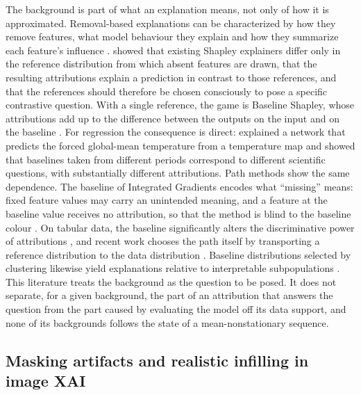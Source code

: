 \documentclass{article}
\begin{document}
The background is part of what an explanation means, not only of how it is approximated. Removal-based explanations can be characterized by how they remove features, what model behaviour they explain and how they summarize each feature's influence \citep{covert2021explaining}. \citet{merrick2020explanation} showed that existing Shapley explainers differ only in the reference distribution from which absent features are drawn, that the resulting attributions explain a prediction in contrast to those references, and that the references should therefore be chosen consciously to pose a specific contrastive question. With a single reference, the game is Baseline Shapley, whose attributions add up to the difference between the outputs on the input and on the baseline \citep{sundararajan2020many}. For regression the consequence is direct: \citet{mamalakis2023carefully} explained a network that predicts the forced global-mean temperature from a temperature map and showed that baselines taken from different periods correspond to different scientific questions, with substantially different attributions. Path methods show the same dependence. The baseline of Integrated Gradients \citep{sundararajan2017axiomatic} encodes what ``missing'' means: fixed feature values may carry an unintended meaning, and a feature at the baseline value receives no attribution, so that the method is blind to the baseline colour \citep{sturmfels2020visualizing}. On tabular data, the baseline significantly alters the discriminative power of attributions \citep{haug2021baselines}, and recent work chooses the path itself by transporting a reference distribution to the data distribution \citep{zhang2026baselines}. Baseline distributions selected by clustering likewise yield explanations relative to interpretable subpopulations \citep{chen2022explaining}. This literature treats the background as the question to be posed. It does not separate, for a given background, the part of an attribution that answers the question from the part caused by evaluating the model off its data support, and none of its backgrounds follows the state of a mean-nonstationary sequence.

\subsection{Masking artifacts and realistic infilling in image XAI}\label{sec:related:image}
\end{document}
